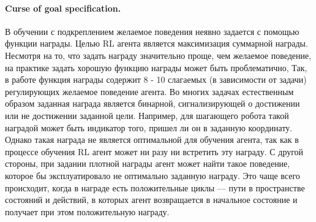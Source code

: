 \paragraph{Curse of goal specification.}
В обучении с подкреплением желаемое поведения неявно задается с помощью функции награды. Целью RL агента является максимизация суммарной награды. Несмотря на то, что задать награду значительно проще, чем желаемое поведение, на практике задать хорошую функцию награды может быть проблематично, Так, в работе \cite{hwangbo2019learning} функция награды содержит 8 - 10 слагаемых (в зависимости от задачи) регулирующих желаемое поведение агента. 
Во многих задачах естественным образом заданная награда является бинарной, сигнализирующей о достижении или не достижении заданной цели. Например, для шагающего робота такой наградой может быть индикатор того, пришел ли он в заданную координату. Однако такая награда не является оптимальной для обучения агента, так как в процессе обучения RL агент может ни разу ни встретить эту награду. 
С другой стороны, при задании плотной награды агент может найти такое поведение, которое бы эксплуатировало не оптимально заданную награду. Это чаще всего происходит, когда в награде есть положительные циклы --- пути в пространстве состояний и действий, в которых агент возвращается в начальное состояние и получает при этом положительную награду. 




\FloatBarrier

